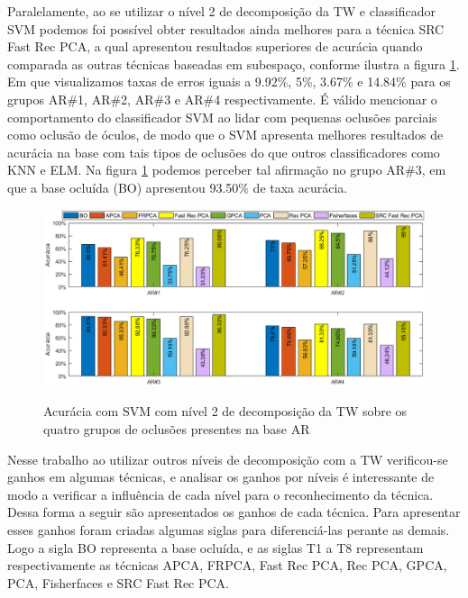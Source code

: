 Paralelamente, ao se utilizar o nível 2 de decomposição da TW e classificador SVM podemos foi possível obter resultados ainda melhores para a técnica SRC Fast Rec PCA, a qual apresentou resultados superiores  de acurácia quando comparada as outras técnicas baseadas em subespaço, conforme ilustra a figura \ref{fig:acuracia_SVM_AR_4_grupos_nivel2}. Em que visualizamos taxas de erros iguais a 9.92\%, 5\%, 3.67\% e 14.84\% para os grupos AR\#1, AR\#2, AR\#3 e AR\#4 respectivamente. É válido mencionar o comportamento do classificador SVM ao lidar com pequenas oclusões parciais como oclusão de óculos, de modo que o SVM apresenta melhores resultados de acurácia na base com tais tipos de oclusões do que outros classificadores como KNN e ELM. Na figura \ref{fig:acuracia_SVM_AR_4_grupos_nivel2} podemos perceber tal afirmação no grupo AR\#3, em que a base ocluída (BO) apresentou 93.50\% de taxa acurácia.

\begin{figure}[H]
\centering
\caption{Acurácia com SVM com nível 2 de decomposição da TW sobre os quatro grupos de oclusões presentes na base AR}
\includegraphics[scale=0.55]{imgs4/acuracia/nivel_one_two/SVM_nivel2_subespaco}
\label{fig:acuracia_SVM_AR_4_grupos_nivel2}
\end{figure}






Nesse trabalho ao utilizar outros níveis de decomposição com a TW verificou-se ganhos em algumas técnicas, e analisar os ganhos por níveis é interessante de modo a verificar a influência de cada nível para o reconhecimento da técnica. Dessa forma a seguir são apresentados os ganhos de cada técnica. Para apresentar esses ganhos foram criadas algumas siglas para diferenciá-las perante as demais. Logo a sigla BO representa a base ocluída, e as siglas T1 a T8 representam respectivamente as técnicas APCA, FRPCA, Fast Rec PCA, Rec PCA, GPCA, PCA, Fisherfaces e SRC Fast Rec PCA. 


